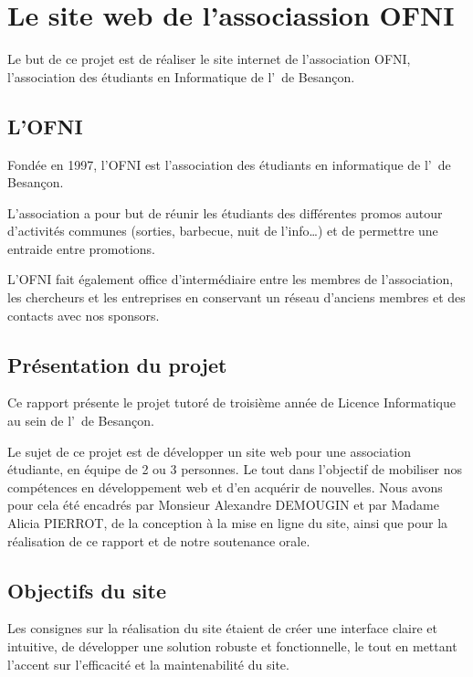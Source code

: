 \chapter{Le site web de l'associassion OFNI}

Le but de ce projet est de réaliser le site internet de l'association OFNI, l'association des étudiants en Informatique de l'\univ\ de Besançon.

\section{L'OFNI}

Fondée en 1997, l'OFNI est l'association des étudiants en informatique de l'\univ\ de Besançon.
\bigskip

L'association a pour but de réunir les étudiants des différentes promos autour d'activités communes (sorties, barbecue, nuit de l'info\ldots) et de permettre une entraide entre promotions.
\bigskip

L'OFNI fait également office d’intermédiaire entre les membres de l’association, les chercheurs et les entreprises en conservant un réseau d’anciens membres et des contacts avec nos sponsors.

\section{Présentation du projet}

Ce rapport présente le projet tutoré de troisième année de Licence Informatique au sein de l'\univ\ de Besançon.
\bigskip

Le sujet de ce projet est de développer un site web pour une association étudiante, en équipe de 2 ou 3 personnes.
Le tout dans l'objectif de mobiliser nos compétences en développement web et d’en acquérir de nouvelles.
Nous avons pour cela été encadrés par Monsieur Alexandre DEMOUGIN et par Madame Alicia PIERROT, de la conception à la mise en ligne du site, ainsi que pour la réalisation de ce rapport et de notre soutenance orale.

\section{Objectifs du site}

Les consignes sur la réalisation du site étaient de créer une interface claire et intuitive, de développer une solution robuste et fonctionnelle, le tout en mettant l’accent sur l’efficacité et la maintenabilité du site.
\bigskip

